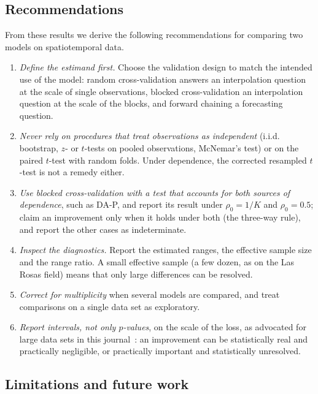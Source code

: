 \subsection{Recommendations}

From these results we derive the following recommendations for comparing two models on spatiotemporal data.
\begin{enumerate}
\item \emph{Define the estimand first.} Choose the validation design to match the intended use of the model: random cross-validation answers an interpolation question at the scale of single observations, blocked cross-validation an interpolation question at the scale of the blocks, and forward chaining a forecasting question.
\item \emph{Never rely on procedures that treat observations as independent} (i.i.d. bootstrap, $z$- or $t$-tests on pooled observations, McNemar's test) or on the paired $t$-test with random folds. Under dependence, the corrected resampled $t$-test is not a remedy either.
\item \emph{Use blocked cross-validation with a test that accounts for both sources of dependence}, such as DA-P, and report its result under $\rho_0=1/K$ and $\rho_0=0.5$; claim an improvement only when it holds under both (the three-way rule), and report the other cases as indeterminate.
\item \emph{Inspect the diagnostics.} Report the estimated ranges, the effective sample size and the range ratio. A small effective sample (a few dozen, as on the Las Rosas field) means that only large differences can be resolved.
\item \emph{Correct for multiplicity} when several models are compared, and treat comparisons on a single data set as exploratory.
\item \emph{Report intervals, not only $p$-values}, on the scale of the loss, as advocated for large data sets in this journal~\cite{caponero2026}: an improvement can be statistically real and practically negligible, or practically important and statistically unresolved.
\end{enumerate}

\subsection{Limitations and future work}


